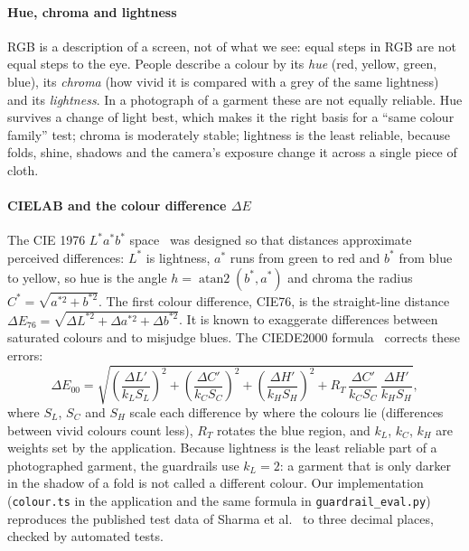 \paragraph{Hue, chroma and lightness} RGB is a description of a screen, not of what we see: equal steps in RGB are not equal steps to the eye. People describe a colour by its \emph{hue} (red, yellow, green, blue), its \emph{chroma} (how vivid it is compared with a grey of the same lightness) and its \emph{lightness}. In a photograph of a garment these are not equally reliable. Hue survives a change of light best, which makes it the right basis for a ``same colour family'' test; chroma is moderately stable; lightness is the least reliable, because folds, shine, shadows and the camera's exposure change it across a single piece of cloth.

\paragraph{CIELAB and the colour difference $\Delta E$} The CIE 1976 $L^*a^*b^*$ space~\cite{cie15} was designed so that distances approximate perceived differences: $L^*$ is lightness, $a^*$ runs from green to red and $b^*$ from blue to yellow, so hue is the angle $h = \operatorname{atan2}(b^*, a^*)$ and chroma the radius $C^* = \sqrt{a^{*2} + b^{*2}}$. The first colour difference, CIE76, is the straight-line distance $\Delta E_{76} = \sqrt{\Delta L^{*2} + \Delta a^{*2} + \Delta b^{*2}}$. It is known to exaggerate differences between saturated colours and to misjudge blues. The CIEDE2000 formula~\cite{ciede2000,sharma} corrects these errors:
\begin{equation}
\Delta E_{00} = \sqrt{\left(\frac{\Delta L'}{k_L S_L}\right)^{2} + \left(\frac{\Delta C'}{k_C S_C}\right)^{2} + \left(\frac{\Delta H'}{k_H S_H}\right)^{2} + R_T\,\frac{\Delta C'}{k_C S_C}\,\frac{\Delta H'}{k_H S_H}},
\end{equation}
where $S_L$, $S_C$ and $S_H$ scale each difference by where the colours lie (differences between vivid colours count less), $R_T$ rotates the blue region, and $k_L$, $k_C$, $k_H$ are weights set by the application. Because lightness is the least reliable part of a photographed garment, the guardrails use $k_L = 2$: a garment that is only darker in the shadow of a fold is not called a different colour. Our implementation (\texttt{colour.ts} in the application and the same formula in \texttt{guardrail\_eval.py}) reproduces the published test data of Sharma et al.~\cite{sharma} to three decimal places, checked by automated tests.

